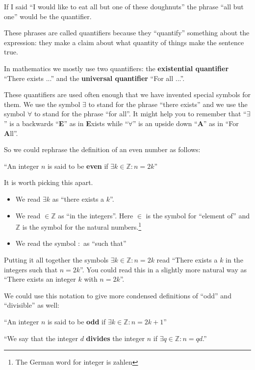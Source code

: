 If I said ``I would like to eat all but one of these doughnuts'' the phrase ``all but one'' would be the quantifier.  

These phrases are called quantifiers because they ``quantify'' something about the expression:  they make a claim about what quantity of things make the sentence true.

In mathematics we mostly use two quantifiers:  the  \textbf{existential quantifier} ``There exists ...''  and the  \textbf{universal quantifier} ``For all ...''.

These quantifiers are used often enough that we have invented special symbols for them.  We use the symbol $\exists$ to stand for the phrase ``there exists'' and we use the symbol $\forall$ to stand for the phrase ``for all''.  It might help you to remember that ``$\exists$'' is a backwards ``\textbf{E}'' as in \textbf{E}xists while ``$\forall$'' is an upside down ``\textbf{A}'' as in ``For \textbf{A}ll''.

So we could rephrase the definition of an even number as follows:

``An integer $n$  is said to be \textbf{even} if $\exists k \in \mathbb{Z}: n = 2k$''

It is worth picking this apart.

\begin{itemize}
\item We read $\exists k$ as ``there exists a $k$''.
\item We read $ \in \mathbb{Z}$ as ``in the integers''.  Here $\in$ is the symbol for ``element of'' and $\mathbb{Z}$ is the symbol for the natural numbers.\footnote{The German word for integer is zahlen}
\item We read the symbol $:$ as ``such that''
\end{itemize}

Putting it all together the symbols  $\exists k \in \mathbb{Z}: n = 2k$ read ``There exists a $k$ in the integers such that $n=2k$''. You could read this in a slightly more natural way as ``There exists an integer $k$ with $n=2k$''.

We could use this notation to give more condensed definitions of ``odd'' and ``divisible'' as well:

``An integer $n$ is said to be \textbf{odd} if $\exists k \in \mathbb{Z}: n = 2k+1$''

``We say that the integer $d$  \textbf{divides} the integer $n$ if $\exists q \in \mathbb{Z}: n = qd$.''

